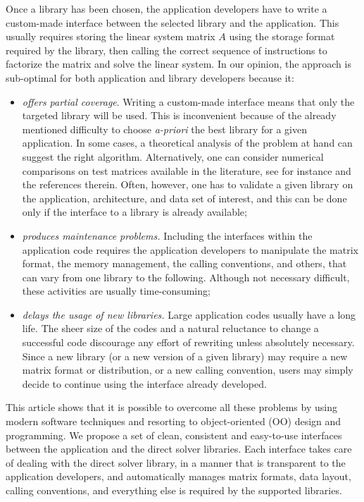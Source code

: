 \documentclass[acmtocl]{acmtrans2m}
\begin{document}
Once a library has been chosen, the application developers have to
write a custom-made interface between the selected library and
the application. This usually requires storing the linear system matrix $A$
using the
  storage format required by the library, then calling the correct sequence of
  instructions to factorize the matrix and solve the linear system.  In our
  opinion, the approach is sub-optimal for both application and library
  developers because it:
\begin{itemize}

\item 
{\sl offers partial coverage}. Writing a custom-made interface means that only the
targeted library will be used.
This is inconvenient because of the already mentioned difficulty to choose
{\sl a-priori} the best library for a given application.
In some cases, a theoretical analysis of
the problem at hand can suggest the right algorithm. Alternatively, one can
consider numerical comparisons on test matrices available in the literature,
see for instance \cite{amestoy01analysis,gupta01recent} and
the references therein. Often, however, one has to validate
a given library on the application, architecture, and data
set of interest, and this can be done only if the interface  to a library
is already available;

\item 
{\sl produces maintenance problems.}
Including the interfaces within the application code requires the application
developers to manipulate the matrix format, the memory
management, the calling conventions, and others, that can vary 
from one library to the following. Although not necessary difficult, these
activities are usually time-consuming;

\item 
{\sl delays the usage of new libraries.} 
Large application codes usually have a long life.  The sheer size of
the codes and a natural reluctance to change a successful code discourage any
effort of rewriting unless absolutely necessary.
Since a new library 
(or a new version of a given library) may require a new matrix format or
distribution, or a new calling convention, users may simply decide to continue
using the interface already developed.
\end{itemize}

This article shows that it is possible to overcome all these problems by using
modern software techniques and resorting to object-oriented (OO) design and
programming.  We propose a set of clean, consistent and easy-to-use interfaces
between the application and the direct solver libraries.  Each interface takes
care of dealing with the direct solver library, in a manner that is
transparent to the application developers, and automatically manages matrix
formats, data layout, calling conventions, and everything else is
required by the supported libraries. 
\end{document}
